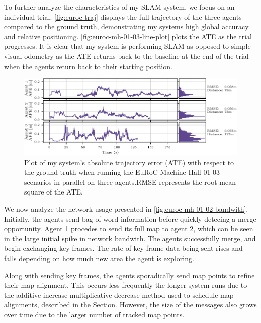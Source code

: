 To further analyze the characteristics of my SLAM system, we focus on an individual trial. \autoref{fig:euroc-traj} displays the full trajectory of the three agents compared to the ground truth, demonstrating my systems high global accuracy and relative positioning. \autoref{fig:euroc-mh-01-03-line-plot} plots the ATE as the trial progresses. It is clear that my system is performing SLAM as opposed to simple visual odometry as the ATE returns back to the baseline at the end of the trial when the agents return back to their starting position.

\begin{figure}[h]
    \centering
    \includegraphics[width=\linewidth]{figures/EuRoC_MH_01-03_line_plot.pdf}

    \caption{Plot of my system's absolute trajectory error (ATE) with respect to the ground truth when running the EuRoC Machine Hall 01-03 scenarios in parallel on three agents.\captionbreak RMSE represents the root mean square of the ATE.}
    \label{fig:euroc-mh-01-03-line-plot}
\end{figure}

We now analyze the network usage presented in \autoref{fig:euroc-mh-01-02-bandwith}. Initially, the agents send bag of word information before quickly detecing a merge opportunity. Agent 1 procedes to send its full map to agent 2, which can be seen in the large initial spike in network bandwith. The agents successfully merge, and begin exchanging key frames. The rate of key frame data being sent rises and falls depending on how much new area the agent is exploring.

Along with sending key frames, the agents sporadically send map points to refine their map alignment. This occurs less frequently the longer system runs due to the additive increase multiplicative decrease method used to schedule map alignments, described in the  Section. However, the size of the messages also grows over time due to the larger number of tracked map points.

